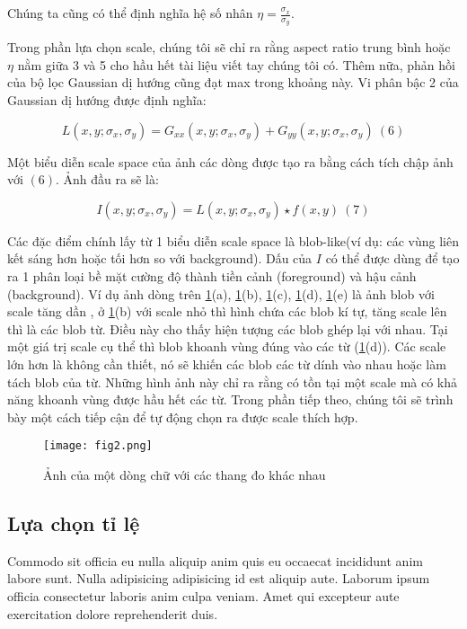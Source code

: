 \documentclass[a4paper]{article}
\begin{document}
Chúng ta cũng có thể định nghĩa hệ số nhân $\eta = \frac {\sigma_x}{\sigma_y}$.

Trong phần lựa chọn scale, chúng tôi sẽ chỉ ra rằng aspect ratio trung bình hoặc $\eta$  nằm giữa 3 và 5 cho hầu hết tài liệu viết tay chúng tôi có. Thêm nữa, phản hồi của bộ lọc Gaussian dị hướng cũng đạt max trong khoảng này. Vi phân bậc 2 của Gaussian dị hướng được định nghĩa:

\begin{equation}
    L(x, y; \sigma_x,\sigma_y) = G_{xx}(x, y; \sigma_x, \sigma_y) + G_{yy}(x, y; \sigma_x, \sigma_y) ~(6)
\end{equation}

Một biểu diễn scale space của ảnh các dòng được tạo ra bằng cách tích chập ảnh với $(6)$. Ảnh đầu ra sẽ là:

\begin{equation}
    I(x, y; \sigma_x, \sigma_y) = L(x, y; \sigma_x, \sigma_y) \star f(x, y)~(7)
\end{equation}

Các đặc điểm chính lấy từ 1 biểu diễn scale space là blob-like(ví dụ: các vùng liên kết sáng hơn hoặc tối hơn so với background). Dấu của $I$ có thể được dùng để tạo ra 1 phân loại bề mặt cường độ thành tiền cảnh (foreground) và hậu cảnh (background). Ví dụ ảnh dòng trên \ref{fig:fig2}(a), \ref{fig:fig2}(b), \ref{fig:fig2}(c), \ref{fig:fig2}(d), \ref{fig:fig2}(e) là ảnh blob với scale tăng dần , ở \ref{fig:fig2}(b) với scale nhỏ thì hình chứa các blob kí tự, tăng scale lên thì là các blob từ. Điều này cho thấy hiện tượng các blob ghép lại với nhau. Tại một giá trị scale cụ thể thì blob khoanh vùng đúng vào các từ (\ref{fig:fig2}(d)). Các scale lớn hơn là không cần thiết, nó sẽ khiến các blob các từ dính vào nhau hoặc làm tách blob của từ. Những hình ảnh này chỉ ra rằng có tồn tại một scale mà có khả năng khoanh vùng được hầu hết các từ. Trong phần tiếp theo, chúng tôi sẽ trình bày một cách tiếp cận để tự động chọn ra được scale thích hợp.

\begin{figure}
    \centering
    \texttt{[image: fig2.png]}
    \caption{Ảnh của một dòng chữ với các thang đo khác nhau}
    \label{fig:fig2}    
\end{figure}

\subsection{Lựa chọn tỉ lệ}
Commodo sit officia eu nulla aliquip anim quis eu occaecat incididunt anim labore sunt. Nulla adipisicing adipisicing id est aliquip aute. Laborum ipsum officia consectetur laboris anim culpa veniam. Amet qui excepteur aute exercitation dolore reprehenderit duis.
\end{document}
